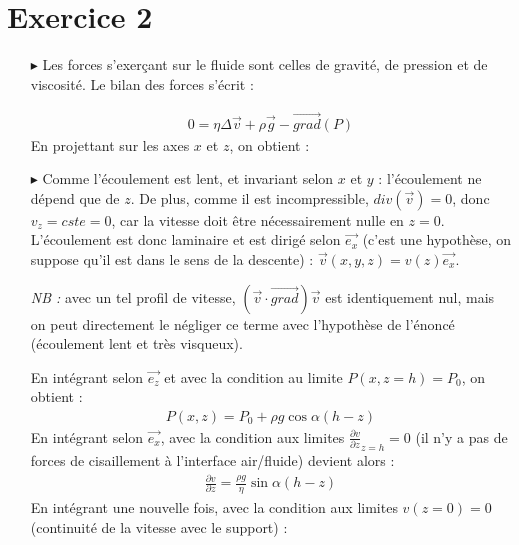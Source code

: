 \documentclass{report}
\begin{document}
\section*{Exercice 2}

\begin{itemize}
	
	\item[$\blacktriangleright$] Les forces s'exerçant sur le fluide sont celles de gravité, de pression et de viscosité. Le bilan des forces s'écrit : 

\begin{align*}
	0=\eta \Delta \vec{v}+\rho\vec{g}-\vec{grad}(P)
\end{align*}
	En projettant sur les axes $x$ et $z$, on obtient :
	
\noindent{}

	\item[$\blacktriangleright$] Comme l'écoulement est lent, et invariant selon $x$ et $y$ : l'écoulement ne dépend que de $z$. De plus, comme il est incompressible, $div(\vec{v})=0$, donc $v_z=cste=0$, car la vitesse doit être nécessairement nulle en $z=0$. L'écoulement est donc laminaire et est dirigé selon $\vec{e_x}$ (c'est une hypothèse, on suppose qu'il est dans le sens de la descente) : $\vec{v}(x,y,z)=v(z)\vec{e_x}$.
	
	\textit{NB : }avec un tel profil de vitesse, $(\vec{v}\cdot\vec{grad})\vec{v}$ est identiquement nul, mais on peut directement le négliger ce terme avec l'hypothèse de l'énoncé (écoulement lent et très visqueux).

En intégrant selon $\vec{e_z}$ et avec la condition au limite $P(x,z=h)=P_0$, on obtient :
\begin{align*}
	P(x,z)=P_0+\rho g\cos\alpha (h-z)
\end{align*}
En intégrant selon $\vec{e_x}$, avec la condition aux limites $\frac{\partial v}{\partial z}_{z=h}=0$ (il n'y a pas de forces de cisaillement à l'interface air/fluide) devient alors : 
\begin{align*}
	\frac{\partial v}{\partial z}=\frac{\rho g}{\eta}\sin\alpha(h-z)
\end{align*}
En intégrant une nouvelle fois, avec la condition aux limites $v(z=0)=0$ (continuité  de la vitesse avec le support) :


\end{itemize}
\end{document}
